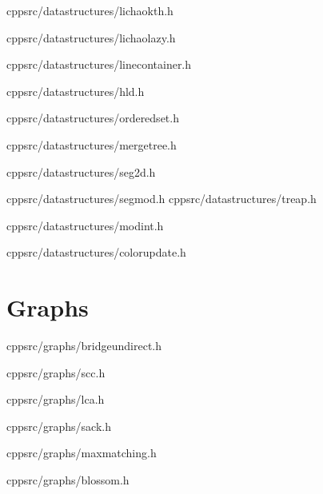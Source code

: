 \documentclass[portrait, 8pt, a4paper, oneside, twocolumn]{extarticle}
\begin{document}
    {}
    {}
    {cpp}{src/datastructures/lichaokth.h}
    \noindent\hrulefill

    {}
    {}
    {cpp}{src/datastructures/lichaolazy.h}
    \noindent\hrulefill

    {}
    {}
    {cpp}{src/datastructures/linecontainer.h}
    \noindent\hrulefill

	{}
	{}
	{cpp}{src/datastructures/hld.h}
	\noindent\hrulefill

    {}
    {}
    {cpp}{src/datastructures/orderedset.h}
    \noindent\hrulefill

	{}
	{}
	{cpp}{src/datastructures/mergetree.h}
	\noindent\hrulefill

    
	{}
	{}
	{cpp}{src/datastructures/seg2d.h}
	\noindent\hrulefill


	{}
	{}
	{cpp}{src/datastructures/segmod.h}
	\noindent\hrulefill
    {}
    {}
    {cpp}{src/datastructures/treap.h}
    \noindent\hrulefill
	
	{}
	{}
	{cpp}{src/datastructures/modint.h}
	\noindent\hrulefill

	{}
	{}
	{cpp}{src/datastructures/colorupdate.h}
	\noindent\hrulefill

\section{Graphs}


    {}
	{}
	{cpp}{src/graphs/bridgeundirect.h}
	\noindent\hrulefill

    {}
	{}
	{cpp}{src/graphs/scc.h}
	\noindent\hrulefill


	{}
	{}
	{cpp}{src/graphs/lca.h}
	\noindent\hrulefill

	{}
	{}
	{cpp}{src/graphs/sack.h}
	\noindent\hrulefill

    {}
    {}
    {cpp}{src/graphs/maxmatching.h}
    \noindent\hrulefill

    {}
    {}
    {cpp}{src/graphs/blossom.h}
    \noindent\hrulefill
\end{document}
